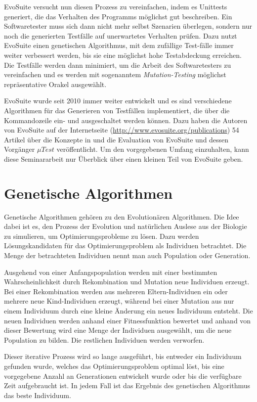 \documentclass[a4paper,11pt]{article}
\begin{document}
EvoSuite versucht nun diesen Prozess zu vereinfachen, indem es Unittests generiert, die das Verhalten des Programms möglichst gut beschreiben.
Ein Softwaretester muss sich dann nicht mehr selbst Szenarien überlegen, sondern nur noch die generierten Testfälle auf unerwartetes Verhalten prüfen.
Dazu nutzt EvoSuite einen genetischen Algorithmus, mit dem zufällige Test-fälle immer weiter verbessert werden, bis sie eine möglichst hohe Testabdeckung erreichen.
Die Testfälle werden dann minimiert, um die Arbeit des Softwaretesters zu vereinfachen und es werden mit sogenanntem \textit{Mutation-Testing} möglichst repräsentative Orakel ausgewählt.

EvoSuite wurde seit 2010 immer weiter entwickelt und es sind verschiedene Algorithmen für das Generieren von Testfällen implementiert, die über die Kommandozeile ein- und ausgeschaltet werden können.
Dazu haben die Autoren von EvoSuite auf der Internetseite (\url{http://www.evosuite.org/publications}) 54 Artikel über die Konzepte in und die Evaluation von EvoSuite und dessen Vorgänger ${\mu}Test$ veröffentlicht.
Um den vorgegebenen Umfang einzuhalten, kann diese Seminararbeit nur Überblick über einen kleinen Teil von EvoSuite geben.

\section{Genetische Algorithmen}
\label{sec:genetische_algorithmen}

Genetische Algorithmen gehören zu den Evolutionären Algorithmen.
Die Idee dabei ist es, den Prozess der Evolution und natürlichen Auslese aus der Biologie zu simulieren, um Optimierungsprobleme zu lösen.
Dazu werden Lösungskandidaten für das Optimierungsproblem als Individuen betrachtet.
Die Menge der betrachteten Individuen nennt man auch Population oder Generation.

Ausgehend von einer Anfangspopulation werden mit einer bestimmten Wahrscheinlichkeit durch Rekombination und Mutation neue Individuen erzeugt.
Bei einer Rekombination werden aus mehreren Eltern-Individuen ein oder mehrere neue Kind-Individuen erzeugt, während bei einer Mutation aus nur einem Individuum durch eine kleine Änderung ein neues Individuum entsteht.
Die neuen Individuen werden anhand einer Fitnessfunktion bewertet und anhand von dieser Bewertung wird eine Menge der Individuen ausgewählt, um die neue Population zu bilden.
Die restlichen Individuen werden verworfen.

Dieser iterative Prozess wird so lange ausgeführt, bis entweder ein Individuum gefunden wurde, welches das Optimierungsproblem optimal löst, bis eine vorgegebene Anzahl an Generationen entwickelt wurde oder bis die verfügbare Zeit aufgebraucht ist.
In jedem Fall ist das Ergebnis des genetischen Algorithmus das beste Individuum.
\end{document}
